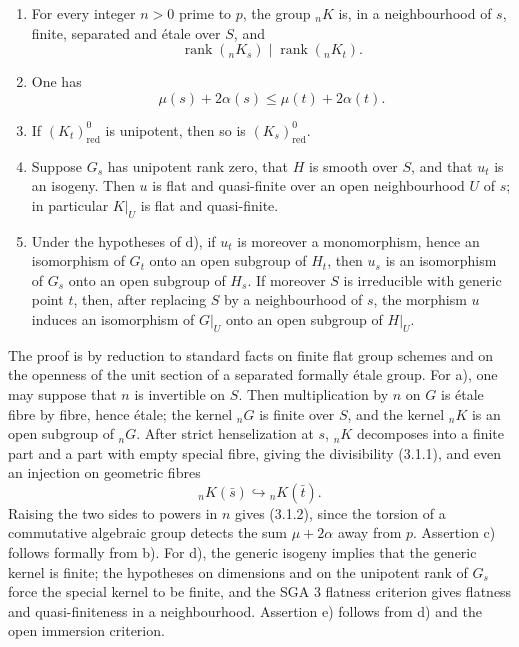 \documentclass[11pt]{article}
\providecommand{\rank}{\operatorname{rank}}
\begin{document}
\begin{enumerate}[label=\alph*)]
\item For every integer \(n>0\) prime to \(p\), the group \({}_nK\) is, in a neighbourhood of \(s\), finite, separated and étale over \(S\), and
\begin{equation}\tag{3.1.1}
        \rank({}_nK_s)\mid \rank({}_nK_t).
\end{equation}
\item One has
\begin{equation}\tag{3.1.2}
        \mu(s)+2\alpha(s)\leq \mu(t)+2\alpha(t).
\end{equation}
\item If \((K_t)^0_{\mathrm{red}}\) is unipotent, then so is \((K_s)^0_{\mathrm{red}}\).
\item Suppose \(G_s\) has unipotent rank zero, that \(H\) is smooth over \(S\), and that \(u_t\) is an isogeny.  Then \(u\) is flat and quasi-finite over an open neighbourhood \(U\) of \(s\); in particular \(K|_U\) is flat and quasi-finite.
\item Under the hypotheses of d), if \(u_t\) is moreover a monomorphism, hence an isomorphism of \(G_t\) onto an open subgroup of \(H_t\), then \(u_s\) is an isomorphism of \(G_s\) onto an open subgroup of \(H_s\).  If moreover \(S\) is irreducible with generic point \(t\), then, after replacing \(S\) by a neighbourhood of \(s\), the morphism \(u\) induces an isomorphism of \(G|_U\) onto an open subgroup of \(H|_U\).
\end{enumerate}

The proof is by reduction to standard facts on finite flat group schemes and on the openness of the unit section of a separated formally étale group.  For a), one may suppose that \(n\) is invertible on \(S\).  Then multiplication by \(n\) on \(G\) is étale fibre by fibre, hence étale; the kernel \({}_nG\) is finite over \(S\), and the kernel \({}_nK\) is an open subgroup of \({}_nG\).  After strict henselization at \(s\), \({}_nK\) decomposes into a finite part and a part with empty special fibre, giving the divisibility (3.1.1), and even an injection on geometric fibres
\[
        {}_nK(\bar s)\hookrightarrow {}_nK(\bar t).
\]
Raising the two sides to powers in \(n\) gives (3.1.2), since the torsion of a commutative algebraic group detects the sum \(\mu+2\alpha\) away from \(p\).  Assertion c) follows formally from b).  For d), the generic isogeny implies that the generic kernel is finite; the hypotheses on dimensions and on the unipotent rank of \(G_s\) force the special kernel to be finite, and the SGA 3 flatness criterion gives flatness and quasi-finiteness in a neighbourhood.  Assertion e) follows from d) and the open immersion criterion.
\end{document}

